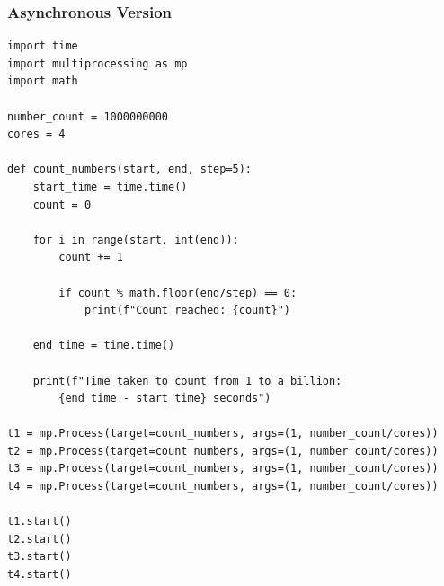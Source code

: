 \documentclass[12pt,a4paper]{article}
\begin{document}
\subsubsection{Asynchronous Version}
\begin{verbatim}
import time
import multiprocessing as mp
import math

number_count = 1000000000
cores = 4

def count_numbers(start, end, step=5):
    start_time = time.time()
    count = 0

    for i in range(start, int(end)):
        count += 1
        
        if count % math.floor(end/step) == 0:
            print(f"Count reached: {count}")

    end_time = time.time()

    print(f"Time taken to count from 1 to a billion: 
        {end_time - start_time} seconds")

t1 = mp.Process(target=count_numbers, args=(1, number_count/cores))
t2 = mp.Process(target=count_numbers, args=(1, number_count/cores))
t3 = mp.Process(target=count_numbers, args=(1, number_count/cores))
t4 = mp.Process(target=count_numbers, args=(1, number_count/cores))

t1.start()
t2.start()
t3.start()
t4.start()
\end{verbatim}
\end{document}
